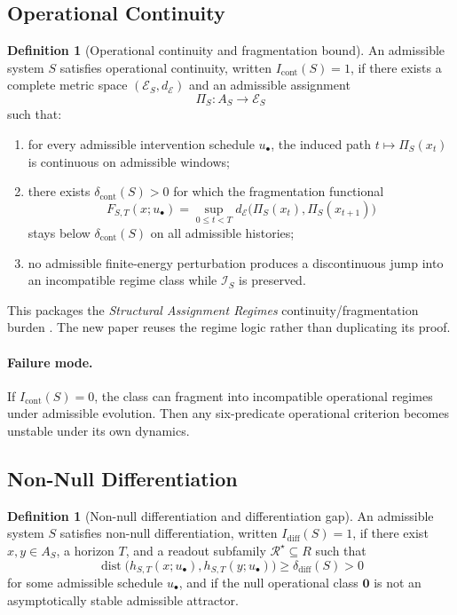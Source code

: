 \documentclass[11pt,a4paper]{article}
\theoremstyle{definition}
\newtheorem{definition}[theorem]{Definition}
\newcommand{\Icont}{I_{\mathrm{cont}}}
\newcommand{\Idiff}{I_{\mathrm{diff}}}
\newcommand{\Aset}{A_S}
\newcommand{\dist}{\operatorname{dist}}
\newcommand{\Id}{\mathcal{I}}
\newcommand{\Read}{\mathscr{R}}
\newcommand{\nullclass}{\mathbf{0}}
\begin{document}
\subsection{Operational Continuity}
\begin{definition}[Operational continuity and fragmentation bound]\label{def:icont}
An admissible system $S$ satisfies operational continuity, written $\Icont(S)=1$, if there exists a complete metric space $(\mathcal{E}_S,d_{\mathcal{E}})$ and an admissible assignment
\[
\Pi_S : \Aset \to \mathcal{E}_S
\]
such that:
\begin{enumerate}[leftmargin=1.5em]
\item for every admissible intervention schedule $u_\bullet$, the induced path $t \mapsto \Pi_S(x_t)$ is continuous on admissible windows;
\item there exists $\delta_{\mathrm{cont}}(S) > 0$ for which the fragmentation functional
\[
F_{S,T}(x;u_\bullet)
=
\sup_{0 \le t < T} d_{\mathcal{E}}\bigl(\Pi_S(x_t), \Pi_S(x_{t+1})\bigr)
\]
stays below $\delta_{\mathrm{cont}}(S)$ on all admissible histories;
\item no admissible finite-energy perturbation produces a discontinuous jump into an incompatible regime class while $\Id_S$ is preserved.
\end{enumerate}
\end{definition}

This packages the \textit{Structural Assignment Regimes} continuity/fragmentation burden \cite{paper2}. The new paper reuses the regime logic rather than duplicating its proof.

\paragraph{Failure mode.}
If $\Icont(S)=0$, the class can fragment into incompatible operational regimes under admissible evolution. Then any six-predicate operational criterion becomes unstable under its own dynamics.

\subsection{Non-Null Differentiation}
\begin{definition}[Non-null differentiation and differentiation gap]\label{def:idiff}
An admissible system $S$ satisfies non-null differentiation, written $\Idiff(S)=1$, if there exist $x,y \in \Aset$, a horizon $T$, and a readout subfamily $\Read^\star \subseteq R$ such that
\[
\dist\bigl(h_{S,T}(x;u_\bullet), h_{S,T}(y;u_\bullet)\bigr) \ge \delta_{\mathrm{diff}}(S) > 0
\]
for some admissible schedule $u_\bullet$, and if the null operational class $\nullclass$ is not an asymptotically stable admissible attractor.
\end{definition}
\end{document}
